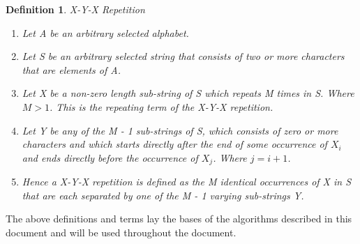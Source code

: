 \documentclass[12pt]{article}
\newtheorem{defn}{Definition}[section]
\begin{document}
\begin{flushleft}
	\begin{defn} X-Y-X Repetition
		\begin{enumerate}
			\item Let A be an arbitrary selected alphabet.
			\item Let S be an arbitrary selected string that consists of two or more characters that are elements of A. 
			\item Let X be a non-zero length sub-string of S which repeats M times in S. Where $ M > 1 $. This is the repeating term of the X-Y-X repetition.		
			\item  Let Y be any of the M - 1 sub-strings of S, which consists of zero or more characters and which starts directly after the end of some occurrence of $X_{i}$ and ends directly before the occurrence of $X_{j}$. Where $j = i + 1$.
			\item Hence a X-Y-X repetition is defined as the M identical occurrences of X in S that are each separated by one of the M - 1 varying sub-strings Y.	
		\end{enumerate}
	\end{defn}
	
	The above definitions and terms lay the bases of the algorithms described in this document and will be used throughout the document.
\end{flushleft}
\newpage
\end{document}
